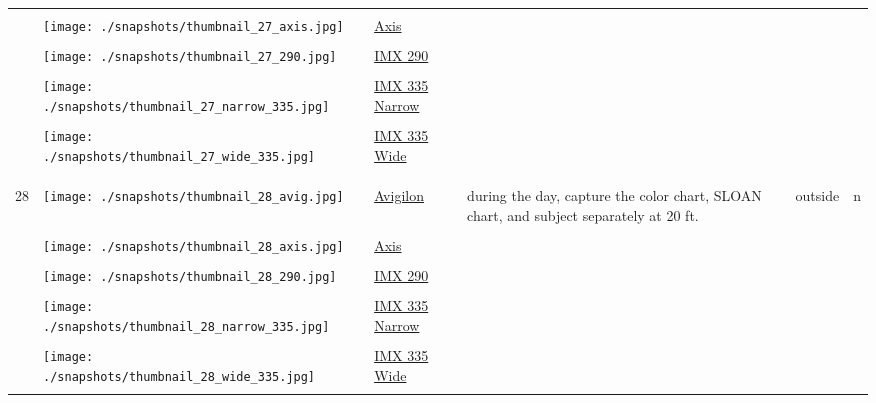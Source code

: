 \documentclass{article}%
\begin{document}
\begin{longtabu}{m{2.5cm} m{4cm} m{2cm} m{4cm} m{2cm} m{2cm}}
&&&&&\\%
&\texttt{[image: ./snapshots/thumbnail\_27\_axis.jpg]}&\href{https://drive.google.com/file/d/13KNtxjCPd_5YemUN7ZNBKm4awYd3OgEZ/view?usp=sharing}{Axis}&&&\\%
&&&&&\\%
&\texttt{[image: ./snapshots/thumbnail\_27\_290.jpg]}&\href{https://drive.google.com/file/d/1cgYz3Fe2YVhamTrYGzUOtzYqRdigghhy/view?usp=sharing}{IMX 290}&&&\\%
&&&&&\\%
&\texttt{[image: ./snapshots/thumbnail\_27\_narrow\_335.jpg]}&\href{https://drive.google.com/file/d/1tNcADzvq6sva8ROi9QFROD95bg4np1Bu/view?usp=sharing}{IMX 335 Narrow}&&&\\%
&&&&&\\%
&\texttt{[image: ./snapshots/thumbnail\_27\_wide\_335.jpg]}&\href{https://drive.google.com/file/d/1eGYqFac0B-xuU_kPwa73MxuttXxe8ima/view?usp=sharing}{IMX 335 Wide}&&&\\%
&&&&&\\%
&&&&&\\%
\hline%
&&&&&\\%
28&\texttt{[image: ./snapshots/thumbnail\_28\_avig.jpg]}&\href{https://drive.google.com/file/d/1qY24i4J5oMQCYwwCha-wzzJA9dQjl5yl/view?usp=sharing}{Avigilon}&during the day, capture the color chart, SLOAN chart, and subject separately at 20 ft.&outside&n\\%
&&&&&\\%
&\texttt{[image: ./snapshots/thumbnail\_28\_axis.jpg]}&\href{https://drive.google.com/file/d/1G5jidMohITcLxfSU-Nn2xugmFFi7NW39/view?usp=sharing}{Axis}&&&\\%
&&&&&\\%
&\texttt{[image: ./snapshots/thumbnail\_28\_290.jpg]}&\href{https://drive.google.com/file/d/1sBT6lgyg0SZvER9X1-2u4PFd8_tzKnuq/view?usp=sharing}{IMX 290}&&&\\%
&&&&&\\%
&\texttt{[image: ./snapshots/thumbnail\_28\_narrow\_335.jpg]}&\href{https://drive.google.com/file/d/1c6T0O9XYibiD5K6M2NAwgiK-9JzK0qOR/view?usp=sharing}{IMX 335 Narrow}&&&\\%
&&&&&\\%
&\texttt{[image: ./snapshots/thumbnail\_28\_wide\_335.jpg]}&\href{https://drive.google.com/file/d/1CTbVKhw8Crt5HzOWbPOLuWDYVuZol77X/view?usp=sharing}{IMX 335 Wide}&&&\\%
&&&&&\\%

\end{longtabu}
\end{document}

